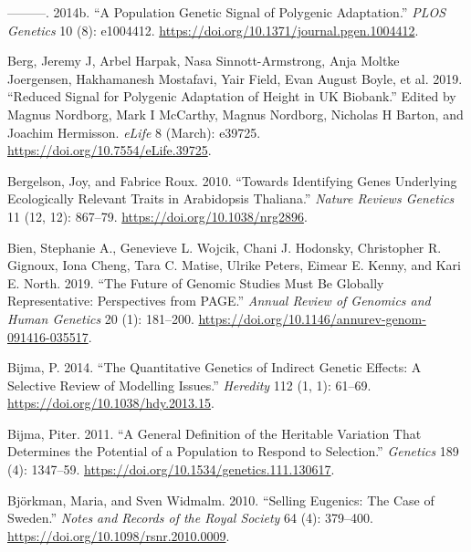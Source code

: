 \documentclass[
]{book}
\newlength{\cslhangindent}
\newlength{\cslentryspacingunit} %
\newenvironment{CSLReferences}[2] %
 {%
  \setlength{\parindent}{0pt}
  \ifodd #1
  \let\oldpar\par
  \def\par{\hangindent=\cslhangindent\oldpar}
  \fi
  \setlength{\parskip}{#2\cslentryspacingunit}
 }%
 {}
\begin{document}
\begin{CSLReferences}{1}{0}
\leavevmode{}%
---------. 2014b. {``A {Population Genetic Signal} of {Polygenic Adaptation}.''} \emph{PLOS Genetics} 10 (8): e1004412. \url{https://doi.org/10.1371/journal.pgen.1004412}.

\leavevmode{}%
Berg, Jeremy J, Arbel Harpak, Nasa Sinnott-Armstrong, Anja Moltke Joergensen, Hakhamanesh Mostafavi, Yair Field, Evan August Boyle, et al. 2019. {``Reduced Signal for Polygenic Adaptation of Height in {UK Biobank}.''} Edited by Magnus Nordborg, Mark I McCarthy, Magnus Nordborg, Nicholas H Barton, and Joachim Hermisson. \emph{eLife} 8 (March): e39725. \url{https://doi.org/10.7554/eLife.39725}.

\leavevmode{}%
Bergelson, Joy, and Fabrice Roux. 2010. {``Towards Identifying Genes Underlying Ecologically Relevant Traits in {Arabidopsis} Thaliana.''} \emph{Nature Reviews Genetics} 11 (12, 12): 867--79. \url{https://doi.org/10.1038/nrg2896}.

\leavevmode{}%
Bien, Stephanie A., Genevieve L. Wojcik, Chani J. Hodonsky, Christopher R. Gignoux, Iona Cheng, Tara C. Matise, Ulrike Peters, Eimear E. Kenny, and Kari E. North. 2019. {``The {Future} of {Genomic Studies Must Be Globally Representative}: {Perspectives} from {PAGE}.''} \emph{Annual Review of Genomics and Human Genetics} 20 (1): 181--200. \url{https://doi.org/10.1146/annurev-genom-091416-035517}.

\leavevmode{}%
Bijma, P. 2014. {``The Quantitative Genetics of Indirect Genetic Effects: A Selective Review of Modelling Issues.''} \emph{Heredity} 112 (1, 1): 61--69. \url{https://doi.org/10.1038/hdy.2013.15}.

\leavevmode{}%
Bijma, Piter. 2011. {``A {General Definition} of the {Heritable Variation That Determines} the {Potential} of a {Population} to {Respond} to {Selection}.''} \emph{Genetics} 189 (4): 1347--59. \url{https://doi.org/10.1534/genetics.111.130617}.

\leavevmode{}%
Björkman, Maria, and Sven Widmalm. 2010. {``Selling Eugenics: The Case of {Sweden}.''} \emph{Notes and Records of the Royal Society} 64 (4): 379--400. \url{https://doi.org/10.1098/rsnr.2010.0009}.


\end{CSLReferences}
\end{document}

